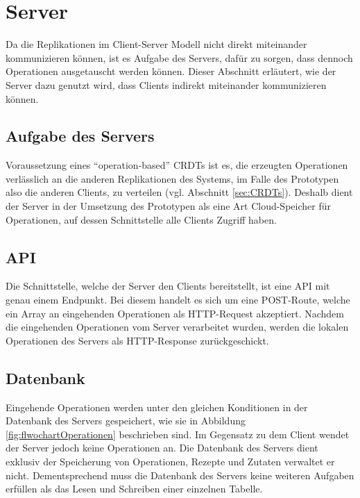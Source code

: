 \documentclass[a4paper, 12pt]{scrreprt}
\begin{document}
\section{Server}

Da die Replikationen im Client-Server Modell nicht direkt miteinander kommunizieren können, ist es Aufgabe des Servers, dafür zu sorgen, dass dennoch Operationen ausgetauscht werden können. Dieser Abschnitt erläutert, wie der Server dazu genutzt wird, dass Clients indirekt miteinander kommunizieren können. 

\subsection{Aufgabe des Servers}
\label{sec:AufgabeServer}

Voraussetzung eines \enquote{operation-based} \acp{CRDT} ist es, die erzeugten Operationen verlässlich an die anderen Replikationen des Systems, im Falle des Prototypen also die anderen Clients, zu verteilen (vgl. Abschnitt \ref{sec:CRDTs}). Deshalb dient der Server in der Umsetzung des Prototypen als eine Art Cloud-Speicher für Operationen, auf dessen Schnittstelle alle Clients Zugriff haben. 

\subsection{API}

Die Schnittstelle, welche der Server den Clients bereitstellt, ist eine API mit genau einem Endpunkt. Bei diesem handelt es sich um eine POST-Route, welche ein Array an eingehenden Operationen als HTTP-Request akzeptiert. Nachdem die eingehenden Operationen vom Server verarbeitet wurden, werden die lokalen Operationen des Servers als HTTP-Response zurückgeschickt. 

\subsection{Datenbank}

Eingehende Operationen werden unter den gleichen Konditionen in der Datenbank des Servers gespeichert, wie sie in Abbildung \ref{fig:flwochartOperationen} beschrieben sind. Im Gegensatz zu dem Client wendet der Server jedoch keine Operationen an. Die Datenbank des Servers dient exklusiv der Speicherung von Operationen, Rezepte und Zutaten verwaltet er nicht. Dementsprechend muss die Datenbank des Servers keine weiteren Aufgaben erfüllen als das Lesen und Schreiben einer einzelnen Tabelle. 
\end{document}
